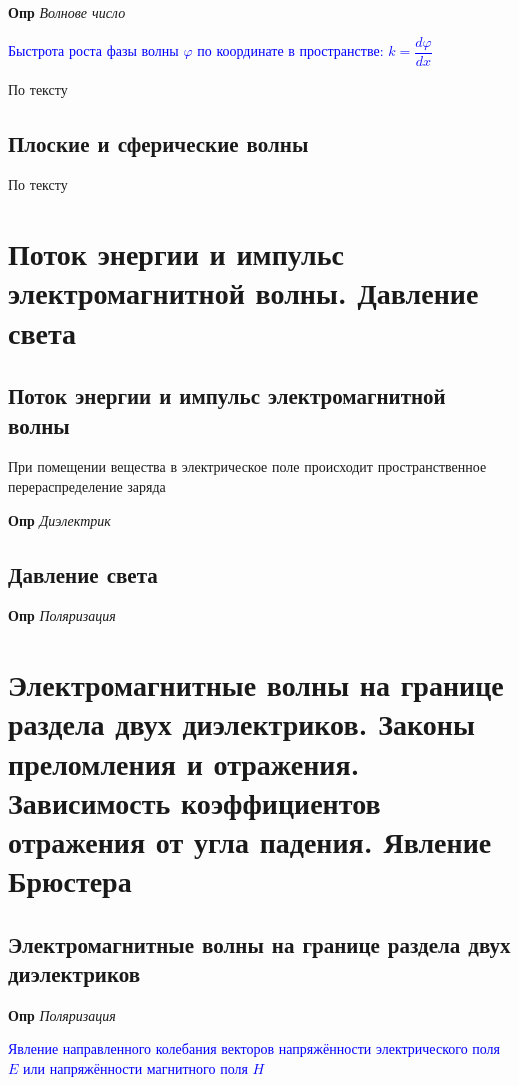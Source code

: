 \documentclass[a4paper, 14pt]{article}
\begin{document}
    \textbf{Опр} \textit{Волнове число}
    
    \textcolor{blue}{Быстрота роста фазы волны $\varphi$ по координате в пространстве: $k = \dfrac{d \varphi}{d x}$}
    
    По тексту
    
    \subsection{Плоские и сферические волны}
    
    По тексту
    
    \section{Поток энергии и импульс электромагнитной волны.
    Давление света}
    
    \subsection{Поток энергии и импульс электромагнитной волны}
    
    При помещении вещества в электрическое поле происходит пространственное перераспределение заряда
    
    \textbf{Опр} \textit{Диэлектрик}
    
    \subsection{Давление света}
    
    \textbf{Опр} \textit{Поляризация}
    
    \section{Электромагнитные волны на границе раздела двух диэлектриков.
    Законы преломления и отражения.
    Зависимость коэффициентов отражения от угла падения.
    Явление Брюстера}
    
    \subsection{Электромагнитные волны на границе раздела двух диэлектриков}
    
    \textbf{Опр} \textit{Поляризация}
    
    \textcolor{blue}{Явление направленного колебания векторов напряжённости электрического поля $E$ или напряжённости
    магнитного поля $H$}
    
\end{document}
